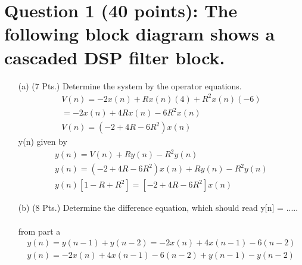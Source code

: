 \documentclass[a4paper, 11pt]{report}
\begin{document}
{\section*{\textbf{Question 1 (40 points): }The following block diagram shows a cascaded DSP filter block.} 
\begin{itemize}
\item[(a)] (7 Pts.) Determine the system by the operator equations.
\begin{align*}
V(n) = -2x(n) + Rx(n)(4) + R^2x(n)(-6) \\
= -2x(n) + 4Rx(n) -6R^2x(n)\\
V(n) = (-2+4R-6R^2)x(n)
\end{align*}
y(n) given by
\begin{align*}
y(n) = V(n) + Ry(n)-R^2y(n) \\
y(n) = (-2+4R-6R^2)x(n)+ Ry(n)-R^2y(n) \\
y(n) [1 - R + R^2] = [-2+4R-6R^2]x(n)
\end{align*}
\item[(b)] (8 Pts.) Determine the difference equation, which should read y[n] = .....
\\ \\
from part a
\begin{align*}
y(n) = y(n-1) + y(n-2) = -2x(n) + 4x(n-1) -6(n-2)\\
y(n) = -2x(n) + 4x(n-1) -6(n-2) + y(n-1) - y(n-2)
\end{align*}
\end{itemize}
}
\end{document}
